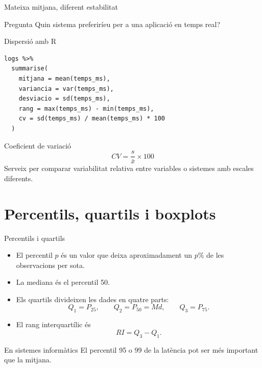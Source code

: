 \documentclass[10pt,aspectratio=169]{beamer}
\begin{document}
\begin{frame}{Mateixa mitjana, diferent estabilitat}
\begin{center}
\end{center}
\begin{block}{Pregunta}
Quin sistema preferiríeu per a una aplicació en temps real?
\end{block}
\end{frame}

\begin{frame}[fragile]{Dispersió amb R}
\begin{lstlisting}
logs %>%
  summarise(
    mitjana = mean(temps_ms),
    variancia = var(temps_ms),
    desviacio = sd(temps_ms),
    rang = max(temps_ms) - min(temps_ms),
    cv = sd(temps_ms) / mean(temps_ms) * 100
  )
\end{lstlisting}
\vspace{0.2cm}
\begin{block}{Coeficient de variació}
\[
CV = \frac{s}{\bar{x}}\times 100
\]
Serveix per comparar variabilitat relativa entre variables o sistemes amb escales diferents.
\end{block}
\end{frame}

\section{Percentils, quartils i boxplots}

\begin{frame}{Percentils i quartils}
\begin{itemize}
  \item El percentil $p$ és un valor que deixa aproximadament un $p\%$ de les observacions per sota.
  \item La mediana és el percentil 50.
  \item Els quartils divideixen les dades en quatre parts:
  \[
  Q_1=P_{25}, \qquad Q_2=P_{50}=Md, \qquad Q_3=P_{75}.
  \]
  \item El rang interquartílic és
  \[
  RI = Q_3-Q_1.
  \]
\end{itemize}
\begin{alertblock}{En sistemes informàtics}
El percentil 95 o 99 de la latència pot ser més important que la mitjana.
\end{alertblock}
\end{frame}
\end{document}
